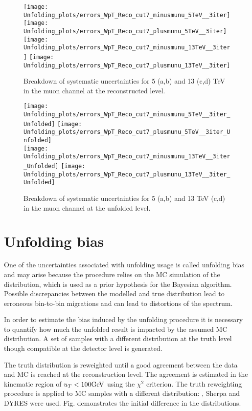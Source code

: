 \begin{figure}[h]
	\centering
	{\texttt{[image: Unfolding\_plots/errors\_WpT\_Reco\_cut7\_minusmunu\_5TeV\_\_3iter]}}
	{\texttt{[image: Unfolding\_plots/errors\_WpT\_Reco\_cut7\_plusmunu\_5TeV\_\_3iter]}} \\
	{\texttt{[image: Unfolding\_plots/errors\_WpT\_Reco\_cut7\_minusmunu\_13TeV\_\_3iter]}}
	{\texttt{[image: Unfolding\_plots/errors\_WpT\_Reco\_cut7\_plusmunu\_13TeV\_\_3iter]}}
	\caption{ Breakdown of systematic uncertainties for 5 (a,b) and 13 (c,d) TeV in the muon channel at the reconstructed level.}
	\label{fig:reco_sys_bkd_muons}
\end{figure}

\begin{figure}[h]
	\centering
	{\texttt{[image: Unfolding\_plots/errors\_WpT\_Reco\_cut7\_minusmunu\_5TeV\_\_3iter\_Unfolded]}}
	{\texttt{[image: Unfolding\_plots/errors\_WpT\_Reco\_cut7\_plusmunu\_5TeV\_\_3iter\_Unfolded]}} \\
	{\texttt{[image: Unfolding\_plots/errors\_WpT\_Reco\_cut7\_minusmunu\_13TeV\_\_3iter\_Unfolded]}}
	{\texttt{[image: Unfolding\_plots/errors\_WpT\_Reco\_cut7\_plusmunu\_13TeV\_\_3iter\_Unfolded]}}
	\caption{ Breakdown of systematic uncertainties for 5 (a,b) and 13 TeV (c,d) in the muon channel at the unfolded level.}
	\label{fig:unf_sys_bkd_muons}
\end{figure}


\clearpage
\section{Unfolding bias}
One of the uncertainties associated with unfolding usage is called unfolding bias and may arise because the procedure relies on the MC simulation of the distribution, which is used as a prior hypothesis for the Bayesian algorithm. Possible discrepancies between the modelled and true distribution lead to erroneous  bin-to-bin migrations and can lead to distortions of the spectrum.

In order to estimate the bias induced by the unfolding procedure it is necessary to quantify how much the unfolded result is impacted by the assumed MC distribution. A set of samples with a different distribution at the truth level though compatible at the detector level is generated. 

The truth distribution is reweighted until a good agreement between the data and MC is reached at the reconstruction level. The agreement is estimated in the kinematic region of $u_T<100\text{Ge\kern -0.1em V}$ using the $\chi^2$ criterion. The truth reweighting procedure is applied to MC samples with a different distribution: \Pythia, Sherpa and DYRES were used. Fig. demonstrates the initial difference in the distributions.

